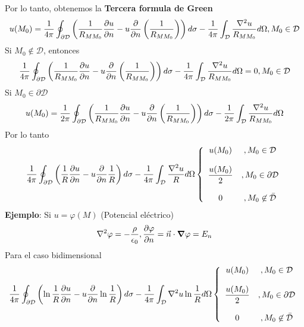 \documentclass[../main]{subfiles}
\begin{document}
Por lo tanto, obtenemos la \textbf{Tercera formula de Green}
\begin{equation}
    u(M_0)=\dfrac{1}{4\pi}\oint_{\partial \mathcal{D}} \left(\dfrac{1}{R_{M M_0}}\pdv{u}{n}-u\pdv{}{n}\left(\dfrac{1}{R_{M M_0}}\right)\right)d\sigma -\dfrac{1}{4\pi}\int_{\mathcal{D}}\dfrac{\nabla^2 u}{R_{M M_0}}d\Omega , M_0 \in \mathcal{D} 
\end{equation}
Si $M_0 \not\in \mathcal{D}$, entonces
\begin{equation}
    \dfrac{1}{4\pi} \oint_{\partial \mathcal{D}} \left(\dfrac{1}{R_{M M_0}}\pdv{u}{n}-u\pdv{}{n}\left(\dfrac{1}{R_{M M_0}}\right)\right)d\sigma-\dfrac{1}{4\pi}\int_{\mathcal{D}}\dfrac{\nabla^2 u}{R_{M M_0}}d\Omega=0 , M_0 \in \mathcal{D}
\end{equation}
Si $M_0 \in \partial \mathcal{D}$
\begin{equation}
    u(M_0)=\dfrac{1}{2\pi}\oint_{\partial \mathcal{D}} \left(\dfrac{1}{R_{M M_0}}\pdv{u}{n}-u\pdv{}{n}\left(\dfrac{1}{R_{M M_0}}\right)\right)d\sigma-\dfrac{1}{2\pi}\int_{\mathcal{D}}\dfrac{\nabla^2 u}{R_{M M_0}}d\Omega
\end{equation}
Por lo tanto
\begin{equation}
    \begin{split}
    \dfrac{1}{4\pi} \oint_{\partial \mathcal{D}} \left(\dfrac{1}{R}\pdv{u}{n}-u\pdv{}{n}\dfrac{1}{R}\right)d\sigma-\dfrac{1}{4\pi}\int_{\mathcal{D}}\dfrac{\nabla^2 u}{R}d\Omega
    \left\{
        \begin{array}{cc}
         u(M_0)    &, M_0 \in \mathcal{D}  \\ \\
         \dfrac{u(M_0)}{2}    &, M_0 \in \partial \mathcal{D}   \\ \\
         0  &, M_0 \not\in \Bar{\mathcal{D}}
        \end{array}
    \right.
    \end{split}
\end{equation}
\textbf{Ejemplo}: Si $u=\varphi(M)$ (Potencial eléctrico)
\begin{equation}
    \nabla^2 \varphi=-\dfrac{\rho}{\epsilon_0}, \pdv{\varphi}{n}=\Vec{n}\cdot \grad{\varphi}=E_n
\end{equation}
Para el caso bidimensional
\begin{equation}
    \begin{split}
    \dfrac{1}{4\pi} \oint_{\partial \mathcal{D}} \left(\ln{\dfrac{1}{R}}\pdv{u}{n}-u\pdv{}{n}\ln{\dfrac{1}{R}}\right)d\sigma-\dfrac{1}{4\pi}\int_{\mathcal{D}}\nabla^2 u \ln{\dfrac{1}{R}}d\Omega
    \left\{
        \begin{array}{cc}
         u(M_0)    &, M_0 \in \mathcal{D}  \\ \\
         \dfrac{u(M_0)}{2}    &, M_0 \in \partial \mathcal{D}   \\ \\
         0  &, M_0 \not\in \Bar{\mathcal{D}}
        \end{array}
    \right.
    \end{split}
\end{equation}
\end{document}
